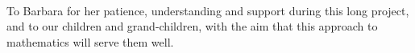 
\maketitle


\ \vfil
\begin{center}
\parbox{24em}{To Barbara for her patience, understanding and support during this long project, and to our children and grand-children, with the aim that this approach to mathematics will serve them well.}
\end{center}


\begin{comment}
\addtocounter{page}{-1}
In this draft, the blue text comments such as this are notes to developers about related references, about reasons for decisions, about more exercises, about possible future extensions, and so on.
Such comments are not intended for the published version, they are only notes for myself and developers.


Outstanding tasks for a first version include:
\begin{itemize}
\item finalising the scope of the book and of applications;
\item exercises on computing that do not require a computer, e.g., interpretation;
\item potentially more applications that involve `real' data, especially in Chapter~5 on approximating matrices;
\item adapt information, especially some uses of the SVD, from the book by Mark Holmes (2016) ``Introduction to scientific computing and data analysis'' Springer;
\item possibly concept maps;
\item short videos of procedures, examples, proofs.
\end{itemize}

The following page is a test of how much one page of information of OUP's style corresponds to my typesetting here, from \emph{p.10 of 2.1 Monograph Design Royal 600wpp normal SAMPLE}. 
In 10pt this line length is a little shorter, but the page length is a little bigger.  Now adjusted textheight so nearly the same amount of info per page when in 10pt.


\end{comment}
